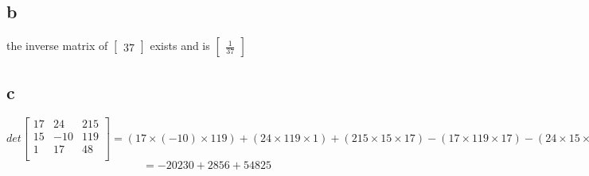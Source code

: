 \documentclass[a4paper,10pt]{article}
\begin{document}
\subsection*{b}
the inverse matrix of 
$
\begin{bmatrix}
 37
\end{bmatrix}
$
exists and is 
$
\begin{bmatrix}
 \frac{1}{37}
\end{bmatrix}
$
\subsection*{c}
\[
det \begin{bmatrix}
     17 & 24  & 215 \\
     15 & -10 & 119\\
     1  & 17  & 48\\
    \end{bmatrix}
=
(17\times(-10)\times119)+(24\times 119\times1)+(215\times15\times17)-(17\times119\times 17)-(24\times 15\times 48)-(215\times(-10)\times1)
\]
\[
= -20230+2856+ 54825 
\]
\end{document}
